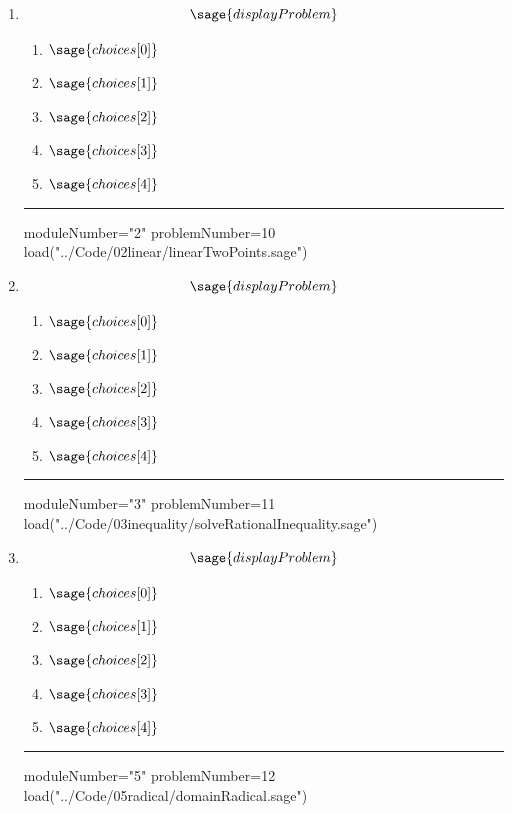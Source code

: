 \documentclass[14pt]{extbook}
\newcommand{\litem}[1]{\item#1\hspace*{-1cm}\rule{\textwidth}{0.4pt}}
\begin{document}
\begin{enumerate}
\litem{ 

   \[ \sage{displayProblem} \]

  	\begin{enumerate}[label=\Alph*.]
    \item \( \sage{choices[0]} \)
    \item \( \sage{choices[1]} \)
    \item \( \sage{choices[2]} \)
    \item \( \sage{choices[3]} \)
    \item \( \sage{choices[4]} \)
  	\end{enumerate}
  }
\begin{sagesilent}
moduleNumber="2"
problemNumber=10
load("../Code/02linear/linearTwoPoints.sage")
\end{sagesilent}

\litem{ 

   \[ \sage{displayProblem} \]

  	\begin{enumerate}[label=\Alph*.]
    \item \( \sage{choices[0]} \)
    \item \( \sage{choices[1]} \)
    \item \( \sage{choices[2]} \)
    \item \( \sage{choices[3]} \)
    \item \( \sage{choices[4]} \)
  	\end{enumerate}
  }
\begin{sagesilent}
moduleNumber="3"
problemNumber=11
load("../Code/03inequality/solveRationalInequality.sage")
\end{sagesilent}

\litem{ 

   \[ \sage{displayProblem} \]

  	\begin{enumerate}[label=\Alph*.]
    \item \( \sage{choices[0]} \)
    \item \( \sage{choices[1]} \)
    \item \( \sage{choices[2]} \)
    \item \( \sage{choices[3]} \)
    \item \( \sage{choices[4]} \)
  	\end{enumerate}
  }
\begin{sagesilent}
moduleNumber="5"
problemNumber=12
load("../Code/05radical/domainRadical.sage")
\end{sagesilent}


\end{enumerate}
\end{document}

